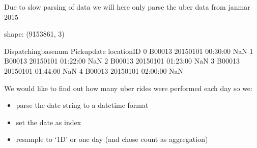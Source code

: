 \documentclass[letterpaper,10pt,english]{jupyterBook}
\begin{document}
\sphinxAtStartPar
Due to slow parsing of data we will here only parse the uber data from jan\sphinxhyphen{}mar 2015

\begin{sphinxVerbatim}[commandchars=\\\{\}]
  \PYG{p}{[}    \PYG{p}{[}\PYG{p}{]}\PYG{p}{]}
\end{sphinxVerbatim}

\begin{sphinxVerbatim}[commandchars=\\\{\}]
  
\end{sphinxVerbatim}

\begin{sphinxVerbatim}[commandchars=\\\{\}]
  
\end{sphinxVerbatim}

\begin{sphinxVerbatim}[commandchars=\\\{\}]
shape: (9153861, 3)
\end{sphinxVerbatim}

\begin{sphinxVerbatim}[commandchars=\\\{\}]
  Dispatching\PYGZus{}base\PYGZus{}num          Pickup\PYGZus{}date  locationID
0               B00013  2015\PYGZhy{}01\PYGZhy{}01 00:30:00         NaN
1               B00013  2015\PYGZhy{}01\PYGZhy{}01 01:22:00         NaN
2               B00013  2015\PYGZhy{}01\PYGZhy{}01 01:23:00         NaN
3               B00013  2015\PYGZhy{}01\PYGZhy{}01 01:44:00         NaN
4               B00013  2015\PYGZhy{}01\PYGZhy{}01 02:00:00         NaN
\end{sphinxVerbatim}

\sphinxAtStartPar
We would like to find out how many uber rides were performed each day so we:
\begin{itemize}
\item {} 
\sphinxAtStartPar
parse the date string to a datetime format

\item {} 
\sphinxAtStartPar
set the date as index

\item {} 
\sphinxAtStartPar
resample to ‘1D’ or one day (and chose count as aggregation)

\end{itemize}
\end{document}
